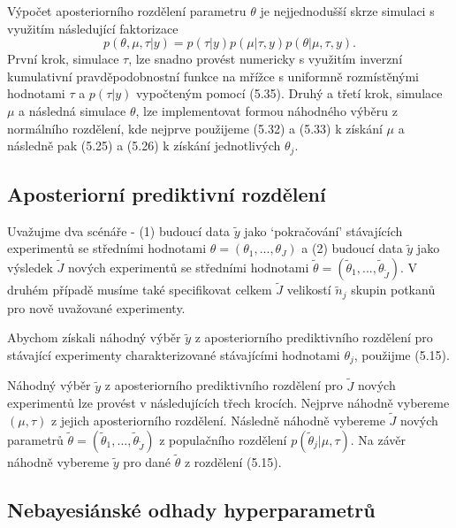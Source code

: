 Výpočet aposteriorního rozdělení parametru $\theta$ je nejjednodušší skrze simulaci s využitím následující faktorizace
\begin{equation}
p(\theta, \mu, \tau | y) = p(\tau | y) p(\mu | \tau, y)p(\theta | \mu, \tau, y).
\end{equation}
První krok, simulace $\tau$, lze snadno provést numericky s využitím inverzní kumulativní pravděpodobnostní funkce na mřížce s uniformně rozmístěnými hodnotami $\tau$ a $p(\tau | y)$ vypočteným pomocí (5.35). Druhý a třetí krok, simulace $\mu$ a následná simulace $\theta$, lze implementovat formou náhodného výběru z normálního rozdělení, kde nejprve použijeme (5.32) a (5.33) k získání $\mu$ a následně pak (5.25) a (5.26) k získání jednotlivých $\theta_j$.

\subsection{Aposteriorní prediktivní rozdělení}

Uvažujme dva scénáře - (1) budoucí data $\tilde{y}$ jako `pokračování' stávajících experimentů se středními hodnotami $\theta = (\theta_1, ..., \theta_J)$ a (2) budoucí data $\tilde{y}$ jako výsledek $\tilde{J}$ nových experimentů se středními hodnotami $\tilde{\theta} = (\tilde{\theta}_1, ..., \tilde{\theta}_{\tilde{J}})$. V druhém případě musíme také specifikovat celkem $\tilde{J}$ velikostí $\tilde{n}_j$ skupin potkanů pro nově uvažované experimenty.

Abychom získali náhodný výběr $\tilde{y}$ z aposteriorního prediktivního rozdělení pro stávající experimenty charakterizované stávajícími hodnotami $\theta_j$, použijme (5.15).

Náhodný výběr $\tilde{y}$ z aposteriorního prediktivního rozdělení pro $\tilde{J}$ nových experimentů lze provést v následujících třech krocích. Nejprve náhodně vybereme $(\mu, \tau)$ z jejich aposteriorního rozdělení. Následně náhodně vybereme $\tilde{J}$ nových parametrů $\tilde{\theta} = (\tilde{\theta}_1, ..., \tilde{\theta}_{\tilde{J}})$ z populačního rozdělení $p(\tilde{\theta}_j | \mu, \tau)$. Na závěr náhodně vybereme $\tilde{y}$ pro dané $\tilde{\theta}$ z rozdělení (5.15).

\subsection{Nebayesiánské odhady hyperparametrů}

